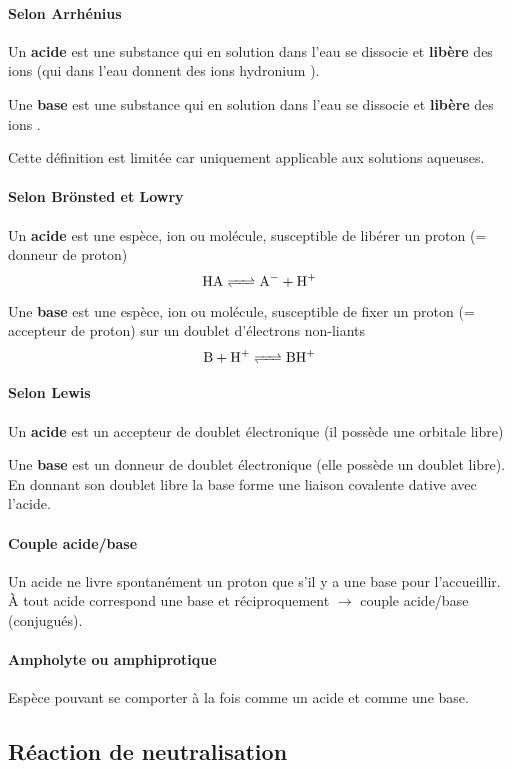 \paragraph{Selon Arrhénius}
Un \textbf{acide} est une substance qui en solution dans l'eau se dissocie
et \textbf{libère} des ions  (qui dans l'eau donnent des ions hydronium
).

Une \textbf{base} est une substance qui en solution dans l'eau se dissocie
et \textbf{libère} des ions .

Cette définition est limitée car uniquement applicable aux solutions aqueuses.

\paragraph{Selon Brönsted et Lowry}
Un \textbf{acide} est une espèce,
ion ou molécule,
susceptible de libérer un proton  (= donneur de proton)
\[ \ce{HA <=> A- + H+} \]

Une \textbf{base} est une espèce, ion ou molécule,
susceptible de fixer un proton  (= accepteur de proton) sur un doublet d'électrons non-liants
\[ \ce{B + H+ <=> BH+} \]

\paragraph{Selon Lewis}
Un \textbf{acide} est un accepteur de doublet électronique (il possède une orbitale libre)

Une \textbf{base} est un donneur de doublet électronique (elle possède un doublet libre).
En donnant son doublet libre la base forme une liaison covalente dative avec l'acide.

\paragraph{Couple acide/base}
Un acide ne livre spontanément un proton que s'il y a une base pour l'accueillir.
À tout acide correspond une base et réciproquement $\rightarrow$ couple acide/base (conjugués).

\paragraph{Ampholyte ou amphiprotique}
Espèce pouvant se comporter à la fois comme un acide et comme une base.

\subsection{Réaction de neutralisation}

